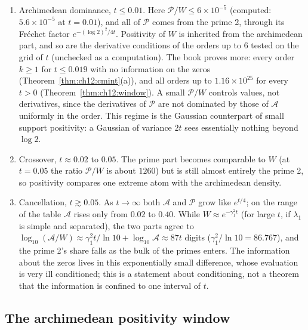 \begin{enumerate}
\item Archimedean dominance, $t\le0.01$. Here $\mathcal P/W\le6\times10^{-5}$ (computed: $5.6\times10^{-5}$ at $t=0.01$), and all of $\mathcal P$ comes from the prime 2, through its Fr\'echet factor $e^{-(\log2)^2/4t}$. Positivity of $W$ is inherited from the archimedean part, and so are the derivative conditions of the orders up to 6 tested on the grid of $t$ (unchecked as a computation). The book proves more: every order $k\ge1$ for $t\le0.019$ with no information on the zeros (Theorem~\ref{thm:ch12:cmint}(a)), and all orders up to $1.16\times10^{25}$ for every $t>0$ (Theorem~\ref{thm:ch12:window}). A small $\mathcal P/W$ controls values, not derivatives, since the derivatives of $\mathcal P$ are not dominated by those of $\mathcal A$ uniformly in the order. This regime is the Gaussian counterpart of small support positivity: a Gaussian of variance $2t$ sees essentially nothing beyond $\log2$.
\item Crossover, $t\approx0.02$ to $0.05$. The prime part becomes comparable to $W$ (at $t=0.05$ the ratio $\mathcal P/W$ is about $1260$) but is still almost entirely the prime 2, so positivity compares one extreme atom with the archimedean density.
\item Cancellation, $t\gtrsim0.05$. As $t\to\infty$ both $\mathcal A$ and $\mathcal P$ grow like $e^{t/4}$; on the range of the table $\mathcal A$ rises only from $0.02$ to $0.40$. While $W\approx e^{-\gamma_1^2t}$ (for large $t$, if $\lambda_1$ is simple and separated), the two parts agree to $\log_{10}(\mathcal A/W)\approx\gamma_1^2t/\ln10+\log_{10}\mathcal A\approx87t$ digits ($\gamma_1^2/\ln10=86.767$), and the prime 2's share falls as the bulk of the primes enters. The information about the zeros lives in this exponentially small difference, whose evaluation is very ill conditioned; this is a statement about conditioning, not a theorem that the information is confined to one interval of $t$.
\end{enumerate}

\subsection{The archimedean positivity window}\label{wt:sec:archwindow}

